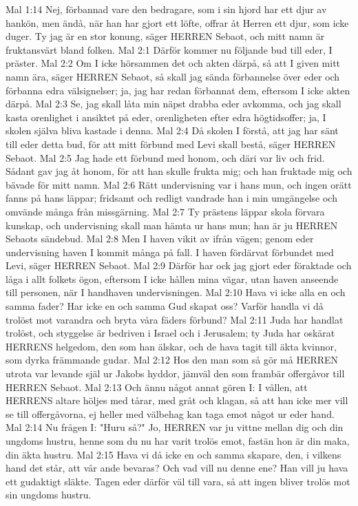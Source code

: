 Mal 1:14  Nej, förbannad vare den bedragare, som i sin hjord har ett djur av hankön, men ändå, när han har gjort ett löfte, offrar åt Herren ett djur, som icke duger. Ty jag är en stor konung, säger HERREN Sebaot, och mitt namn är fruktansvärt bland folken.
Mal 2:1  Därför kommer nu följande bud till eder, I präster.
Mal 2:2  Om I icke hörsammen det och akten därpå, så att I given mitt namn ära, säger HERREN Sebaot, så skall jag sända förbannelse över eder och förbanna edra välsignelser; ja, jag har redan förbannat dem, eftersom I icke akten därpå.
Mal 2:3  Se, jag skall låta min näpst drabba eder avkomma, och jag skall kasta orenlighet i ansiktet på eder, orenligheten efter edra högtidsoffer; ja, I skolen själva bliva kastade i denna.
Mal 2:4  Då skolen I förstå, att jag har sänt till eder detta bud, för att mitt förbund med Levi skall bestå, säger HERREN Sebaot.
Mal 2:5  Jag hade ett förbund med honom, och däri var liv och frid. Sådant gav jag åt honom, för att han skulle frukta mig; och han fruktade mig och bävade för mitt namn.
Mal 2:6  Rätt undervisning var i hans mun, och ingen orätt fanns på hans läppar; fridsamt och redligt vandrade han i min umgängelse och omvände många från missgärning.
Mal 2:7  Ty prästens läppar skola förvara kunskap, och undervisning skall man hämta ur hans mun; han är ju HERREN Sebaots sändebud.
Mal 2:8  Men I haven vikit av ifrån vägen; genom eder undervisning haven I kommit många på fall. I haven fördärvat förbundet med Levi, säger HERREN Sebaot.
Mal 2:9  Därför har ock jag gjort eder föraktade och låga i allt folkets ögon, eftersom I icke hållen mina vägar, utan haven anseende till personen, när I handhaven undervisningen.
Mal 2:10  Hava vi icke alla en och samma fader? Har icke en och samma Gud skapat oss? Varför handla vi då trolöst mot varandra och bryta våra fäders förbund?
Mal 2:11  Juda har handlat trolöst, och styggelse är bedriven i Israel och i Jerusalem; ty Juda har oskärat HERRENS helgedom, den som han älskar, och de hava tagit till äkta kvinnor, som dyrka främmande gudar.
Mal 2:12  Hos den man som så gör må HERREN utrota var levande själ ur Jakobs hyddor, jämväl den som frambär offergåvor till HERREN Sebaot.
Mal 2:13  Och ännu något annat gören I: I vållen, att HERRENS altare höljes med tårar, med gråt och klagan, så att han icke mer vill se till offergåvorna, ej heller med välbehag kan taga emot något ur eder hand.
Mal 2:14  Nu frågen I: "Huru så?" Jo, HERREN var ju vittne mellan dig och din ungdoms hustru, henne som du nu har varit trolös emot, fastän hon är din maka, din äkta hustru.
Mal 2:15  Hava vi då icke en och samma skapare, den, i vilkens hand det står, att vår ande bevaras? Och vad vill nu denne ene? Han vill ju hava ett gudaktigt släkte. Tagen eder därför väl till vara, så att ingen bliver trolös mot sin ungdoms hustru.
